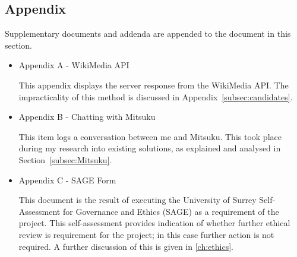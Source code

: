 \subsection*{Appendix}
Supplementary documents and addenda are appended to the document in this section.
\begin{itemize}
	\item Appendix A - WikiMedia API
	\par This appendix displays the server response from the WikiMedia API. The impracticality of this method is discussed in Appendix~\ref{subsec:candidates}.
	
	\item Appendix B - Chatting with Mitsuku
	\par This item logs a conversation between me and Mitsuku. This took place during my research into existing solutions, as explained and analysed in Section~\ref{subsec:Mitsuku}.
	
	\item Appendix C - SAGE Form
	\par This document is the result of executing the University of Surrey Self-Assessment for Governance and Ethics (SAGE) as a requirement of the project. This self-assessment provides indication of whether further ethical review is requirement for the project; in this case further action is not required. A further discussion of this is given in \ref{ch:ethics}.
\end{itemize}
